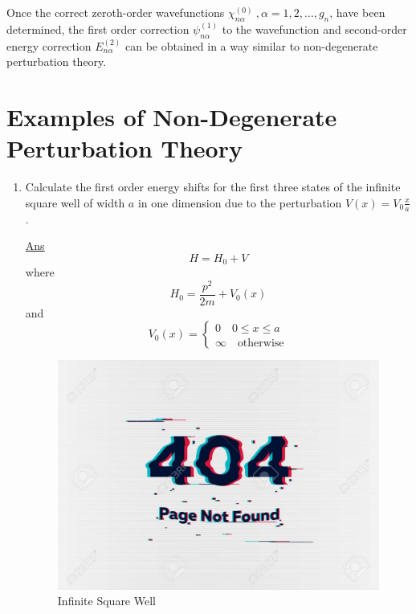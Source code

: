 		Once the correct zeroth-order wavefunctions $\chi_{n\alpha}^{(0)}\ , \alpha=1,2, \ldots, g_n$, have been determined, the first order correction $\psi_{n \alpha}^{(1)}$ to the wavefunction and second-order energy correction $E_{n\alpha}^{(2)}$ can be obtained in a way similar to non-degenerate perturbation theory.
		
		
		
		\section{Examples of Non-Degenerate Perturbation Theory}
		\begin{enumerate}[label=Problem.\arabic*,start=1]
			\item 
			Calculate the first order energy shifts for the first three states of the infinite square well of width $a$ in one dimension due to the perturbation $V(x) = V_0 \frac{x}{a}$.
			
			\underline{Ans}
			\begin{equation*}
				H = H_0 + V
			\end{equation*}
			where
			\begin{equation*}
				H_0 = \frac{p^2}{2m} + V_0(x)
			\end{equation*}
			and
			\begin{equation*}
				V_0(x) = \begin{cases}
				0 \quad 0 \leq x \leq a \\
				\infty \quad \text{otherwise}
				\end{cases}
			\end{equation*}
			
			
			\begin{figure}
				\centering
				\includegraphics[width=0.5\linewidth]{Pictures/not-found.jpg}
				\caption{Infinite Square Well}
			\end{figure}
			

\end{enumerate}
